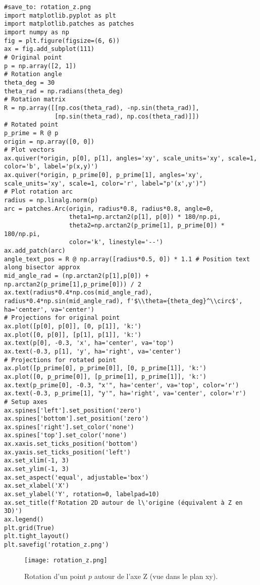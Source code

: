 \begin{verbatim}
#save_to: rotation_z.png
import matplotlib.pyplot as plt
import matplotlib.patches as patches
import numpy as np
fig = plt.figure(figsize=(6, 6))
ax = fig.add_subplot(111)
# Original point
p = np.array([2, 1])
# Rotation angle
theta_deg = 30
theta_rad = np.radians(theta_deg)
# Rotation matrix
R = np.array([[np.cos(theta_rad), -np.sin(theta_rad)],
              [np.sin(theta_rad), np.cos(theta_rad)]])
# Rotated point
p_prime = R @ p
origin = np.array([0, 0])
# Plot vectors
ax.quiver(*origin, p[0], p[1], angles='xy', scale_units='xy', scale=1, color='b', label='p(x,y)')
ax.quiver(*origin, p_prime[0], p_prime[1], angles='xy', scale_units='xy', scale=1, color='r', label="p'(x',y')")
# Plot rotation arc
radius = np.linalg.norm(p)
arc = patches.Arc(origin, radius*0.8, radius*0.8, angle=0,
                  theta1=np.arctan2(p[1], p[0]) * 180/np.pi,
                  theta2=np.arctan2(p_prime[1], p_prime[0]) * 180/np.pi,
                  color='k', linestyle='--')
ax.add_patch(arc)
angle_text_pos = R @ np.array([radius*0.5, 0]) * 1.1 # Position text along bisector approx
mid_angle_rad = (np.arctan2(p[1],p[0]) + np.arctan2(p_prime[1],p_prime[0])) / 2
ax.text(radius*0.4*np.cos(mid_angle_rad), radius*0.4*np.sin(mid_angle_rad), f'$\\theta={theta_deg}^\\circ$', ha='center', va='center')
# Projections for original point
ax.plot([p[0], p[0]], [0, p[1]], 'k:')
ax.plot([0, p[0]], [p[1], p[1]], 'k:')
ax.text(p[0], -0.3, 'x', ha='center', va='top')
ax.text(-0.3, p[1], 'y', ha='right', va='center')
# Projections for rotated point
ax.plot([p_prime[0], p_prime[0]], [0, p_prime[1]], 'k:')
ax.plot([0, p_prime[0]], [p_prime[1], p_prime[1]], 'k:')
ax.text(p_prime[0], -0.3, "x'", ha='center', va='top', color='r')
ax.text(-0.3, p_prime[1], "y'", ha='right', va='center', color='r')
# Setup axes
ax.spines['left'].set_position('zero')
ax.spines['bottom'].set_position('zero')
ax.spines['right'].set_color('none')
ax.spines['top'].set_color('none')
ax.xaxis.set_ticks_position('bottom')
ax.yaxis.set_ticks_position('left')
ax.set_xlim(-1, 3)
ax.set_ylim(-1, 3)
ax.set_aspect('equal', adjustable='box')
ax.set_xlabel('X')
ax.set_ylabel('Y', rotation=0, labelpad=10)
ax.set_title(f'Rotation 2D autour de l\'origine (équivalent à Z en 3D)')
ax.legend()
plt.grid(True)
plt.tight_layout()
plt.savefig('rotation_z.png')
\end{verbatim}
\begin{figure}[H]
\centering
\texttt{[image: rotation\_z.png]}
\caption{Rotation d'un point \( p \) autour de l'axe Z (vue dans le plan xy).}
\label{fig:rotation_z}
\end{figure}
